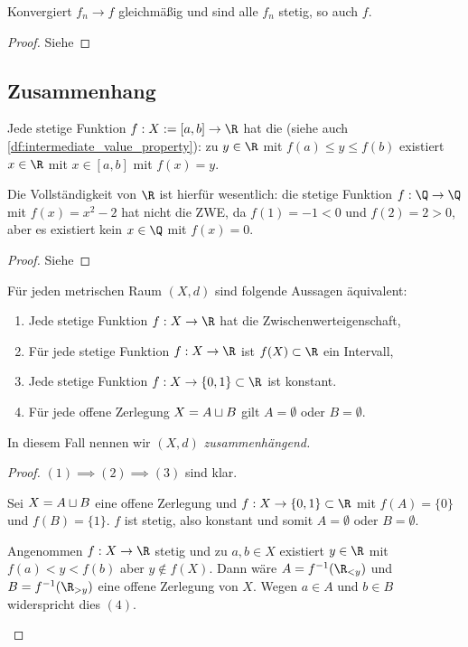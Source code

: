 \begin{st}
	Konvergiert $f_n \to f$ gleichmäßig und sind alle $f_n$ stetig, so auch $f$.
	\begin{proof}
		Siehe 
	\end{proof}
\end{st}

\subsection{Zusammenhang}

\begin{st}[Zwischenwertsatz] \label{st:intermediate_value_theorem}
	Jede stetige Funktion $f: X := [a,b] \to \R$ hat die  (siehe auch \ref{df:intermediate_value_property}): zu $y \in \R$ mit $f(a) \le y \le f(b)$ existiert $x \in \R$ mit $x \in [a,b]$ mit $f(x) = y$.
	\begin{note}
		Die Vollständigkeit von $\R$ ist hierfür wesentlich:
		die stetige Funktion $f: \Q \to \Q$ mit $f(x) = x^2 - 2$ hat nicht die ZWE, da $f(1) = - 1 < 0$ und $f(2) = 2 > 0$, aber es existiert kein $x \in \Q$ mit $f(x) = 0$.
	\end{note}
	\begin{proof}
		Siehe 
	\end{proof}
\end{st}

\begin{st}
	Für jeden metrischen Raum $(X,d)$ sind folgende Aussagen äquivalent:
	\begin{enumerate}[(1)]
		\item
			Jede stetige Funktion $f: X \to \R$ hat die Zwischenwerteigenschaft,
		\item
			Für jede stetige Funktion $f: X \to \R$ ist $f(X) \subset \R$ ein Intervall,
		\item
			Jede stetige Funktion $f: X \to \{0,1\} \subset \R$ ist konstant.
		\item
			Für jede offene Zerlegung $X = A \sqcup B$ gilt $A = \emptyset$ oder $B = \emptyset$.
	\end{enumerate}
	In diesem Fall nennen wir $(X,d)$ \em{zusammenhängend}.
	\begin{proof}
		$(1) \implies (2) \implies (3)$ sind klar.
		\begin{seg}[$(3) \implies (4)$]
			Sei $X = A \sqcup B$ eine offene Zerlegung und $f: X \to \{0, 1\} \subset \R$ mit $f(A) = \{0\}$ und $f(B) = \{1\}$.
			$f$ ist stetig, also konstant und somit $A = \emptyset$ oder $B = \emptyset$.
		\end{seg}
		\begin{seg}[$(4) \implies (1)$]
			Angenommen $f: X \to \R$ stetig und zu $a,b \in X$ existiert $y \in \R$ mit $f(a) < y < f(b)$ aber $y \not\in f(X)$.
			Dann wäre $A = f^{-1}(\R_{<y})$ und $B = f^{-1}(\R_{>y})$ eine offene Zerlegung von $X$.
			Wegen $a \in A$ und $b \in B$ widerspricht dies $(4)$.
		\end{seg}
	\end{proof}
\end{st}

